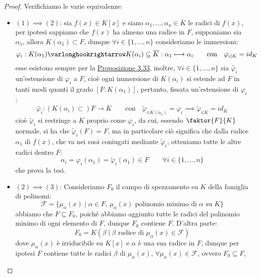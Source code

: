 \documentclass[11pt]{scrartcl}
\begin{document}
\begin{proof}
    Verifichiamo le varie equivalenze:
    \begin{itemize}
        \item \underline{\textbf{$(1)\implies (2)$}}: sia $f(x) \in K[x]$ e siano $\alpha_1,\ldots,\alpha_n \in \overline K$ le radici di $f(x)$, per ipotesi sappiamo che $f(x)$ ha almeno una radice in $F$, supponiamo sia $\alpha_1$, allora $K(\alpha_1) \subset F$, dunque
        $\forall i \in \{1,\ldots,n\}$ consideriamo le immersioni:
        \[ \varphi_i : K(\alpha_1) \varlonghookrightarrow K(\alpha_i) \subseteq \overline K : \alpha_1 \longmapsto \alpha_i \qquad \text{con} \quad \varphi_{i|K} = id_K
            \]
        esse esistono sempre per la \hyperref[3.33]{Proposizione 3.33}, inoltre, $\forall i \in \{1,\ldots,n\}$ sia $\widetilde{\varphi_i}$ un'estensione di $\varphi_i$ a $F$, cioè ogni immersione di $K(\alpha_i)$ si estende ad $F$
        in tanti modi quanti il grado $[F : K(\alpha_1)]$, pertanto, fissata un'estensione di $\varphi_i$:
        \[ \widetilde{\varphi_i} : (K(\alpha_i) \subset)F \longrightarrow \overline K \qquad \text{con} \quad \widetilde{\varphi}_{i|K(\alpha_1)} = \varphi_i \implies \widetilde{\varphi}_{i|K} = id_K
            \]
        cioè $\widetilde{\varphi}_i$ si restringe a $K$ proprio come $\varphi_i$, da cui, essendo $\faktor{F}{K}$ normale, si ha che $\widetilde{\varphi}_i(F) = F$, ma in particolare ciò significa che
        dalla radice $\alpha_1$ di $f(x)$, che va nei suoi coniugati mediante $\widetilde{\varphi}_i$, otteniamo tutte le altre radici dentro $F$:
        \[ \alpha_i = \varphi_i(\alpha_1) = \widetilde{\varphi}_i(\alpha_1) \in F \qquad \forall i \in \{1,\ldots,n\}
            \]
        che prova la tesi.
        \item \underline{\textbf{$(2)\implies (3)$}}: Consideriamo $F_0$ il campo di spezzamento su $K$ della famiglia di polinomi:
        \[ \mathcal{F} = \{\mu_\alpha(x) \mid \alpha \in F, \, \text{$\mu_\alpha(x)$ polinomio minimo di $\alpha$ su $K$}\}
            \]
        abbiamo che $F \subseteq F_0$, poiché abbiamo aggiunto tutte le radici del polinomio minimo di ogni elemento di $F$, dunque $F_0$ contiene $F$.
        D'altra parte:
        \[ F_0 = K(\beta \mid \text{$\beta$ radice di $\mu_\alpha(x) \in \mathcal{F}$})
            \]
        dove $\mu_\alpha(x)$ è irriducibile su $K[x]$ e $\alpha$ è una sua radice in $F$, dunque per ipotesi $F$ contiene tutte le radici $\beta$ di $\mu_\alpha(x)$, $\forall \mu_\alpha(x) \in \mathcal{F}$, ovvero $F_0 \subseteq F$,

\end{itemize}
\end{proof}
\end{document}
